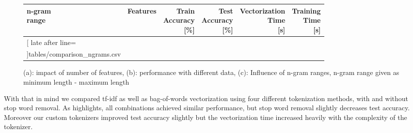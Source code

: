 \documentclass[10pt]{article}
\begin{document}
\begin{figure}[htbp]
\begin{minipage}[t]{0.48\textwidth}
			
			\vspace{10pt} %
			
			\small
			\setlength{\tabcolsep}{4pt}
			\renewcommand{\arraystretch}{1.1}
			\begin{adjustbox}{scale=.8, valign=t}
				\begin{tabular}{|l|l|r|r|r|r|}
					\hline
					\rowcolor{gray!30}
					\bfseries \makecell{n-gram\\range} & 
					\bfseries Features & 
					\bfseries \makecell{Train\\Accuracy\\{\footnotesize[\%]}} & 
					\bfseries \makecell{Test\\Accuracy\\{\footnotesize[\%]}} & 
					\bfseries \makecell{Vectorization\\Time\\{\footnotesize[s]}} & 
					\bfseries \makecell{Training\\Time\\{\footnotesize[s]}} \\
					\hline
					\csvreader[
					late after line=\\\hline
					]{tables/comparison_ngrams.csv}{}%
					{\csvcoli & \csvcolii & \csvcoliii & \csvcoliv & \csvcolv & \csvcolvi}%
				\end{tabular}
			\end{adjustbox}
			\subcaption{}
		\end{minipage}
		
		\caption{(a): impact of number of features, (b): performance with different data, (c): Influence of n-gram ranges, n-gram range given as minimum length - maximum length}
		\label{Fig 2}
	\end{figure}
	

	
		
	With that in mind we compared tf-idf as well as bag-of-words vectorization using four different tokenization methods, with and without stop word removal. As  highlights, all combinations achieved similar performance, but stop word removal slightly decreases test accuracy. Moreover our custom tokenizers improved test accuracy slightly but the vectorization time increased heavily with the complexity of the tokenizer. \newline\newline
	
\end{document}
